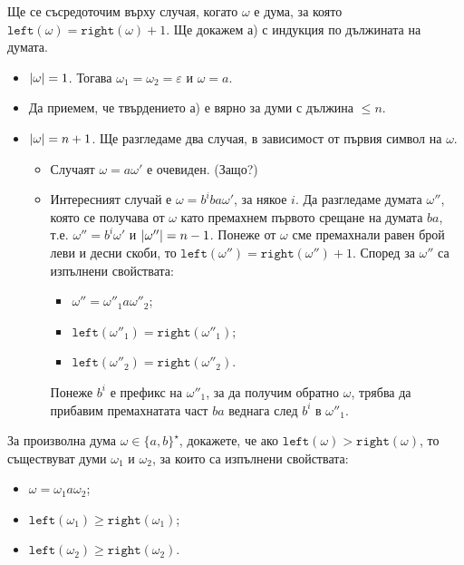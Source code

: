 \begin{hint}
  Ще се съсредоточим върху случая, когато $\omega$ е дума, за която $\texttt{left}(\omega) = \texttt{right}(\omega) + 1$.
  Ще докажем а) с индукция по дължината на думата.
  \begin{itemize}
  \item 
    $\vert{\omega}\vert = 1$. Тогава $\omega_1 = \omega_2 = \varepsilon$ и $\omega = a$.
  \item
    Да приемем, че твърдението а) е вярно за думи с дължина $\leq n$.
  \item
    $\vert{\omega}\vert = n+1$. Ще разгледаме два случая, в зависимост от първия символ на $\omega$.
    \begin{itemize}
    \item 
      Случаят $\omega = a\omega'$ е очевиден. (Защо?)
    \item
      Интересният случай е $\omega = b^i ba \omega'$, за някое $i$.
      Да разгледаме думата $\omega''$, която се получава от $\omega$
      като премахнем първото срещане на думата $ba$, т.е. 
      $\omega'' = b^i\omega'$ и $\vert{\omega''}\vert = n-1$.
      Понеже от $\omega$ сме премахнали равен брой леви и десни скоби, то
      $\texttt{left}(\omega'') = \texttt{right}(\omega'')+1$.
      Според \IndHyp за $\omega''$ са изпълнени свойствата:
      \begin{itemize}
      \item 
        $\omega'' = \omega''_1 a \omega''_2$;
      \item
        $\texttt{left}(\omega''_1) = \texttt{right}(\omega''_1)$;
      \item
        $\texttt{left}(\omega''_2) = \texttt{right}(\omega''_2)$.
      \end{itemize}
      Понеже $b^i$ е префикс на $\omega''_1$, за да получим обратно $\omega$, трябва 
      да прибавим премахнатата част $ba$ веднага след $b^i$ в $\omega''_1$.
    \end{itemize}
  \end{itemize}
\end{hint}

\begin{problem}
  За произволна дума $\omega \in \{ a,b \}^\star$, 
  докажете, че ако $\texttt{left}(\omega) > \texttt{right}(\omega)$, то съществуват думи $\omega_1$ и $\omega_2$,
  за които са изпълнени свойствата:
  \begin{itemize}
  \item 
    $\omega = \omega_1 a \omega_2$;
  \item
    $\texttt{left}(\omega_1) \geq \texttt{right}(\omega_1)$;
  \item
    $\texttt{left}(\omega_2) \geq \texttt{right}(\omega_2)$.
  \end{itemize}
\end{problem}


